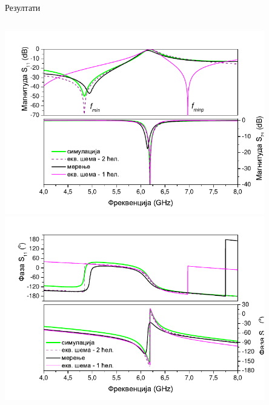 \documentclass{beamer}
\begin{document}
\begin{frame}[t]{Резултати}

    \begin{columns}[c]
        \includegraphics[width=0.85\textwidth]{sl_ekv/fig11a}
        \includegraphics[width=0.85\textwidth]{sl_ekv/fig11b}


\end{columns}
\end{frame}
\end{document}
